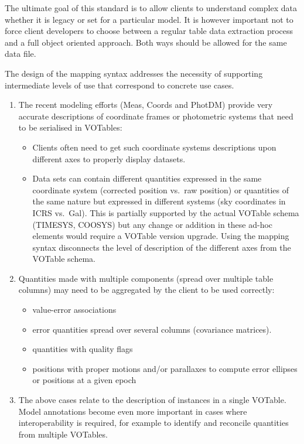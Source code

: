 
The ultimate goal of this standard is to allow clients to understand complex data whether it is legacy or set for a particular model. It is however important not to force client developers  to choose between a regular table data extraction process and a full object oriented approach. Both ways should be allowed for the same data file.

The design of the mapping syntax addresses the necessity of supporting intermediate levels of use that correspond to concrete use cases.

\begin{enumerate}
  \item The recent modeling efforts (Meas, Coords and PhotDM) provide very accurate descriptions of coordinate frames or photometric 
        systems that need to be serialised in VOTables:
  \begin{itemize}
    \item Clients often need to get such coordinate systems descriptions upon different axes to properly display datasets. 
    \item Data sets can contain different quantities expressed in the
          same coordinate system (corrected position vs.~raw position) or 
          quantities of the same nature but expressed in different
          systems (sky coordinates in ICRS vs.~Gal). 
          This is partially supported by the actual VOTable schema (TIMESYS, COOSYS) but any change or addition 
          in these ad-hoc elements would require a VOTable version upgrade. 
          Using the mapping syntax disconnects the level of description of the different axes from the VOTable schema.           
  \end{itemize} 
  
  \item Quantities made with multiple components (spread over multiple table columns) may need to be aggregated by the client to be used correctly:
  \begin{itemize}
    \item value-error associations
    \item error quantities spread over several columns (covariance matrices). 
    \item quantities with quality flags
    \item positions with proper motions and/or parallaxes to compute error ellipses or positions at a given epoch
  \end{itemize} 

  \item The above cases relate to the description of instances in a
  single VOTable. Model annotations become even more important in cases
  where interoperability is required, for example to identify and
  reconcile quantities from multiple VOTables.


\end{enumerate}
